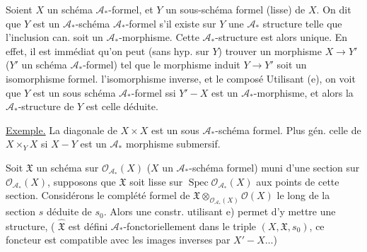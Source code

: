 Soient $X$ un schéma $\mathcal A_*$-formel, et $Y$ un sous-schéma formel (lisse) de $X$.  On dit que $Y$ est un  $\mathcal A_*$-schéma $\mathcal A_*$-formel s'il existe sur $Y$ une $\mathcal A_*$ structure telle que l'inclusion can. soit un $\mathcal A_*$-morphisme. Cette $\mathcal A_*$-structure est alors unique. En effet, il est immédiat qu'on peut (sans hyp. sur $Y$) trouver un  morphisme $X\to Y'$ ($Y'$ un schéma $\mathcal A_*$-formel) tel que le morphisme induit $Y\to Y'$ soit un isomorphisme formel.   l'isomorphisme inverse, et le composé
Utilisant (e), on  voit que  $Y$ est un sous schéma $\mathcal A_*$-formel ssi $Y'\mathbin{-}X$ est un $\mathcal A_*$-morphisme, et alors la $\mathcal A_*$-structure de $Y$ est celle déduite.

\uline{Exemple.} La diagonale de $X\times X$ est un sous $\mathcal A_*$-schéma formel. Plus gén. celle de $X\times_Y X$ si $X\mathbin{-}Y$ est un $\mathcal A_*$ morphisme submersif. 

Soit $\mathfrak X$ un schéma sur $\mathcal O_{\mathcal A_*}(X)$ ($X$ un $\mathcal A_*$-schéma formel) muni d'une section  sur $\mathcal O_{\mathcal A_*}(X)$, supposons que $\mathfrak X$ soit lisse sur $\operatorname{Spec}\mathcal O_{\mathcal A_*}(X)$ aux points de cette section. Considérons le complété formel  de $\mathfrak X\otimes_{\mathcal O_{\mathcal A_*}(X)}\mathcal O(X)$ le long de la section $s$ déduite de $s_0$. Alors une constr. utilisant e) permet d'y mettre une  structure,  ( $\hat{\mathfrak X}$ est défini $\mathcal A_*$-fonctoriellement dans le triple $(X,\mathfrak X,s_0)$, ce foncteur est compatible avec les images inverses par $X'\mathbin{-}X\ldots$)


